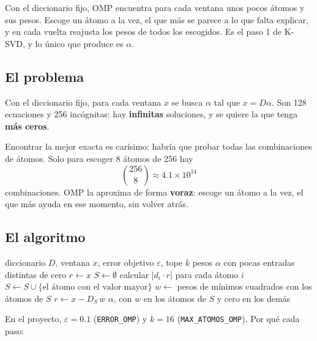 \documentclass[11pt,letterpaper]{article}
\begin{document}
\begin{quick_sum}
    Con el diccionario fijo, OMP encuentra para cada ventana unos pocos
    átomos y sus pesos. Escoge un átomo a la vez, el que más se parece
    a lo que falta explicar, y en cada vuelta reajusta los pesos de
    todos los escogidos. Es el paso 1 de K-SVD, y lo único que produce
    es $\alpha$.
\end{quick_sum}

\subsection*{El problema}

Con el diccionario fijo, para cada ventana $x$ se busca $\alpha$ tal
que $x = D\alpha$. Son 128 ecuaciones y 256 incógnitas: hay
\textbf{infinitas} soluciones, y se quiere la que tenga \textbf{más
ceros}.

Encontrar la mejor exacta es carísimo: habría que probar todas las
combinaciones de átomos. Solo para escoger 8 átomos de 256 hay
\[
    \binom{256}{8} \approx 4.1 \times 10^{14}
\]
combinaciones. OMP la aproxima de forma \textbf{voraz}: escoge un átomo
a la vez, el que más ayuda en ese momento, sin volver atrás.

\subsection*{El algoritmo}

\begin{algorithm}[H]
\caption{Orthogonal Matching Pursuit sobre una ventana}
\begin{algorithmic}[1]
    \Require diccionario $D$, ventana $x$, error objetivo $\varepsilon$,
             tope $k$
    \Ensure pesos $\alpha$ con pocas entradas distintas de cero
    \State $r \gets x$ 
    \State $S \gets \emptyset$ 
        \State calcular $|d_i \cdot r|$ para cada átomo $i$
        \State $S \gets S \cup \{\text{el átomo con el valor
               mayor}\}$
        \State $w \gets$ pesos de mínimos cuadrados con los átomos
               de $S$
        \State $r \gets x - D_S\, w$
    \EndWhile
    \State \Return $\alpha$, con $w$ en los átomos de $S$ y cero en
           los demás
\end{algorithmic}
\end{algorithm}

En el proyecto, $\varepsilon = 0.1$ (\texttt{ERROR\_OMP}) y $k = 16$
(\texttt{MAX\_ATOMOS\_OMP}). Por qué cada paso:
\end{document}
